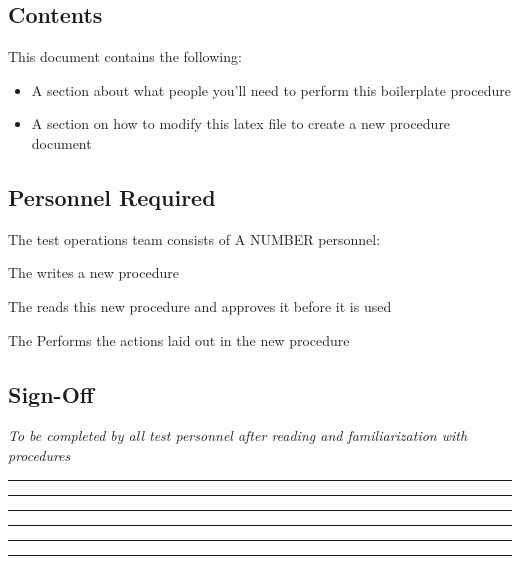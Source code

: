 \subsection{Contents}
This document contains the following:
\begin{itemize}
    \item A section about what people you'll need to perform this boilerplate procedure
    \item A section on how to modify this latex file to create a new procedure document
\end{itemize}

\subsection{Personnel Required}
The test operations team consists of A NUMBER personnel:
\begin{checklist}
    \item The \authfull{} writes a new procedure
    \item The \edifull{} reads this new procedure and approves it before it is used
    \item The \perffull{} Performs the actions laid out in the new procedure
\end{checklist}
\setcounter{checklistnum}{0}

\subsection{Sign-Off}
\textit{To be completed by all test personnel after reading and familiarization with procedures}
\begin{checklist}
    \item \authfull      \tabto{25em}\rule{10em}{0.4pt}\hspace{5em}\rule{10em}{0.4pt}
    \item \edifull      \tabto{25em}\rule{10em}{0.4pt}\hspace{5em}\rule{10em}{0.4pt}
    \item \perffull      \tabto{25em}\rule{10em}{0.4pt}\hspace{5em}\rule{10em}{0.4pt}
\end{checklist}
\setcounter{checklistnum}{0}

